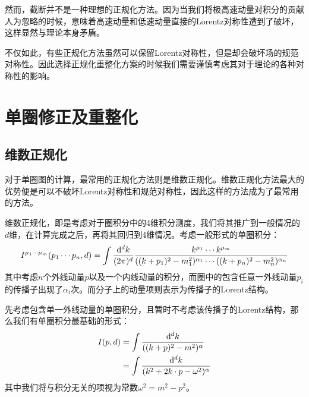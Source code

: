 然而，截断并不是一种理想的正规化方法。因为当我们将极高速动量对积分的贡献人为忽略的时候，意味着高速动量和低速动量直接的Lorentz对称性遭到了破坏，这样显然与理论本身矛盾。

不仅如此，有些正规化方法虽然可以保留Lorentz对称性，但是却会破坏场的规范对称性。因此选择正规化重整化方案的时候我们需要谨慎考虑其对于理论的各种对称性的影响。

\section{单圈修正及重整化}
\subsection*{维数正规化}
对于单圈图的计算，最常用的正规化方法则是维数正规化。维数正规化方法最大的优势便是可以不破坏Lorentz对称性和规范对称性，因此这样的方法成为了最常用的方法。

维数正规化，即是考虑对于圈积分中的4维积分测度，我们将其推广到一般情况的$d$维，在计算完成之后，再将其回归到4维情况。考虑一般形式的单圈积分：
\begin{gather}
I^{\mu_1\cdots\mu_m}(p_1\cdots p_n,d)=\int\frac{\mathrm{d}^d k}{(2\pi)^d}\frac{k^{\mu_1}\cdots k^{\mu_m}}{((k+p_1)^2-m_1^2)^{\alpha_1}\cdots((k+p_n)^2-m_n^2)^{\alpha_n}}\notag\\
\label{eq:loopint}
\end{gather}
其中考虑$n$个外线动量$p$以及一个内线动量的积分，而圈中的包含任意一外线动量$p_i$的传播子出现了$\alpha_i$次。而分子上的动量项则表示为传播子的Lorentz结构。

先考虑包含单一外线动量的单圈积分，且暂时不考虑该传播子的Lorentz结构，那么我们有单圈积分最基础的形式：
\begin{align}
I(p,d)&=\int\frac{\mathrm{d}^d k}{((k+p)^2-m^2)^\alpha}\notag\\
&=\int\frac{\mathrm{d}^d k}{(k^2+2k\cdot p-\omega^2)^\alpha}
\end{align}
其中我们将与积分无关的项视为常数$\omega^2=m^2-p^2$。

